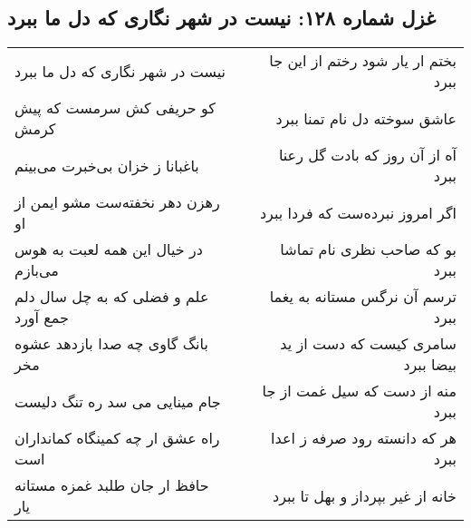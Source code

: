 \begin{center}
\section*{غزل شماره ۱۲۸: نیست در شهر نگاری که دل ما ببرد}
\label{sec:sh128}
\begin{longtable}{l p{0.5cm} r}
نیست در شهر نگاری که دل ما ببرد
&&
بختم ار یار شود رختم از این جا ببرد
\\
کو حریفی کش سرمست که پیش کرمش
&&
عاشق سوخته دل نام تمنا ببرد
\\
باغبانا ز خزان بی‌خبرت می‌بینم
&&
آه از آن روز که بادت گل رعنا ببرد
\\
رهزن دهر نخفته‌ست مشو ایمن از او
&&
اگر امروز نبرده‌ست که فردا ببرد
\\
در خیال این همه لعبت به هوس می‌بازم
&&
بو که صاحب نظری نام تماشا ببرد
\\
علم و فضلی که به چل سال دلم جمع آورد
&&
ترسم آن نرگس مستانه به یغما ببرد
\\
بانگ گاوی چه صدا بازدهد عشوه مخر
&&
سامری کیست که دست از ید بیضا ببرد
\\
جام مینایی می سد ره تنگ دلیست
&&
منه از دست که سیل غمت از جا ببرد
\\
راه عشق ار چه کمینگاه کمانداران است
&&
هر که دانسته رود صرفه ز اعدا ببرد
\\
حافظ ار جان طلبد غمزه مستانه یار
&&
خانه از غیر بپرداز و بهل تا ببرد
\\
\end{longtable}
\end{center}
